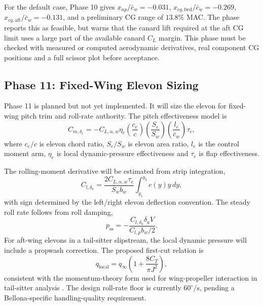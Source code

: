 For the default case, Phase 10 gives \(x_{np}/\bar{c}_w=-0.031\), \(x_{cg,\mathrm{fwd}}/\bar{c}_w=-0.269\), \(x_{cg,\mathrm{aft}}/\bar{c}_w=-0.131\), and a preliminary CG range of \(13.8\%\) MAC. The phase reports this as feasible, but warns that the canard lift required at the aft CG limit uses a large part of the available canard \(C_L\) margin. This phase must be checked with measured or computed aerodynamic derivatives, real component CG positions and a full scissor plot before acceptance.

\subsection{Phase 11: Fixed-Wing Elevon Sizing}
\label{subsec:ppa_phase11}

Phase 11 is planned but not yet implemented. It will size the elevon for fixed-wing pitch trim and roll-rate authority. The pitch effectiveness model is
\begin{equation}
    C_{m,\delta_e}
    =
    -C_{L,\alpha,w}\eta_e
    \left(\frac{c_e}{c}\right)
    \left(\frac{S_e}{S_w}\right)
    \left(\frac{l_e}{\bar{c}_w}\right)
    \tau_e,
    \label{eq:ppa_elevon_pitch}
\end{equation}
where \(c_e/c\) is elevon chord ratio, \(S_e/S_w\) is elevon area ratio, \(l_e\) is the control moment arm, \(\eta_e\) is local dynamic-pressure effectiveness and \(\tau_e\) is flap effectiveness.

The rolling-moment derivative will be estimated from strip integration,
\begin{equation}
    C_{l,\delta_a}
    =
    \frac{2C_{L,\alpha,w}\tau_e}{S_w b_w}
    \int_{y_1}^{y_2} c(y)y\,dy ,
    \label{eq:ppa_roll_derivative}
\end{equation}
with sign determined by the left/right elevon deflection convention. The steady roll rate follows from roll damping,
\begin{equation}
    p_{\mathrm{ss}}
    =
    -\frac{C_{l,\delta_a}\delta_a V}
    {C_{l,p}b_w/2}.
    \label{eq:ppa_steady_roll_rate}
\end{equation}
For aft-wing elevons in a tail-sitter slipstream, the local dynamic pressure will include a propwash correction. The proposed first-cut relation is
\begin{equation}
    q_{\mathrm{local}}
    =
    q_{\infty}
    \left(1+\frac{8C_T}{\pi J^2}\right),
    \label{eq:ppa_cruise_slipstream}
\end{equation}
consistent with the momentum-theory form used for wing-propeller interaction in tail-sitter analysis \cite{Stone2008}. The design roll-rate floor is currently \(60^\circ/\mathrm{s}\), pending a Bellona-specific handling-quality requirement.

